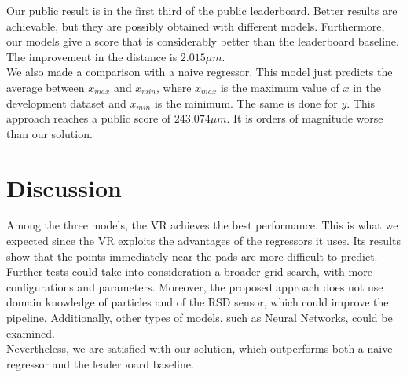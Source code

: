 \documentclass[conference]{IEEEtran}
\begin{document}
Our public result is in the first third of the public leaderboard. Better results are achievable, but they are possibly obtained with different models. Furthermore, our models give a score that is considerably better than the leaderboard baseline. The improvement in the distance is $2.015 \mu m$.\\
We also made a comparison with a naive regressor. This model just predicts the average between $x_{max}$ and $x_{min}$, where $x_{max}$ is the maximum value of $x$ in the development dataset and $x_{min}$ is the minimum. The same is done for $y$.
This approach reaches a public score of $243.074 \mu m$. It is orders of magnitude worse than our solution. \\



\section{Discussion}
Among the three models, the VR achieves the best performance. This is what we expected since the VR exploits the advantages of the regressors it uses. Its results show that the points immediately near the pads are more difficult to predict.\\ 

Further tests could take into consideration a broader grid search, with more configurations and parameters. Moreover, the proposed approach does not use domain knowledge of particles and of the RSD sensor, which could improve the pipeline. Additionally, other types of models, such as Neural Networks, could be examined.\\
Nevertheless, we are satisfied with our solution, which outperforms both a naive regressor and the leaderboard baseline.




\end{document}
